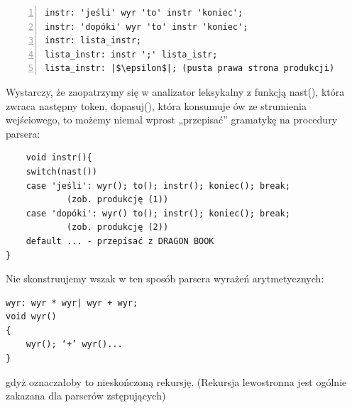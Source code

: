 \begin{lstlisting}[numbers=left]
instr: 'jeśli' wyr 'to' instr 'koniec';
instr: 'dopóki' wyr 'to' instr 'koniec';
instr: lista_instr;
lista_instr: instr ';' lista_istr;
lista_instr: |$\epsilon$|; (pusta prawa strona produkcji)
\end{lstlisting}

Wystarczy, że zaopatrzymy się w analizator leksykalny z funkcją nast(), która zwraca następny token, dopasuj(), która konsumuje ów ze strumienia wejściowego, to możemy niemal wprost „przepisać” gramatykę na procedury parsera:

\begin{lstlisting}
    void instr(){
	switch(nast())
	case 'jeśli': wyr(); to(); instr(); koniec(); break; 
            (zob. produkcję (1))
	case 'dopóki': wyr() to(); instr(); koniec(); break; 
            (zob. produkcję (2))
	default ... - przepisać z DRAGON BOOK
}
\end{lstlisting}
Nie skonstruujemy wszak w ten sposób parsera wyrażeń arytmetycznych:
\begin{lstlisting}
wyr: wyr * wyr| wyr + wyr;
void wyr()
{
    wyr(); ‘+’ wyr()...
}
\end{lstlisting}
gdyż oznaczałoby to nieskończoną rekursję. (Rekursja lewostronna jest ogólnie zakazana dla parserów zstępujących)

